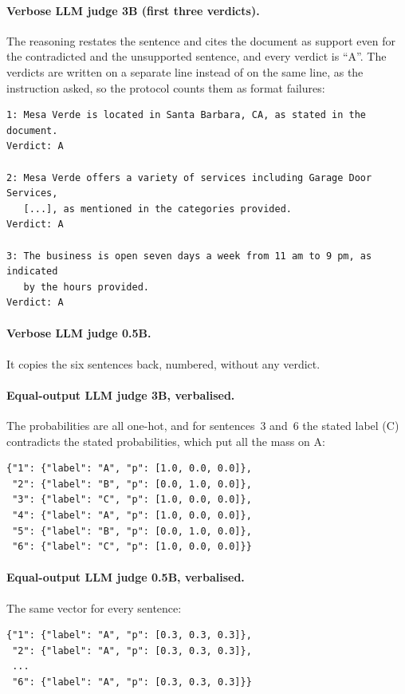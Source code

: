 \paragraph{Verbose LLM judge 3B (first three verdicts).} The reasoning restates the sentence and cites the document as
support even for the contradicted and the unsupported sentence, and every verdict is ``A''. The verdicts are written on
a separate line instead of on the same line, as the instruction asked, so the protocol counts them as format failures:
{\footnotesize
\begin{verbatim}
1: Mesa Verde is located in Santa Barbara, CA, as stated in the document.
Verdict: A

2: Mesa Verde offers a variety of services including Garage Door Services,
   [...], as mentioned in the categories provided.
Verdict: A

3: The business is open seven days a week from 11 am to 9 pm, as indicated
   by the hours provided.
Verdict: A
\end{verbatim}
}

\paragraph{Verbose LLM judge 0.5B.} It copies the six sentences back, numbered, without any verdict.

\paragraph{Equal-output LLM judge 3B, verbalised.} The probabilities are all one-hot, and for sentences~3 and~6 the stated
label (C) contradicts the stated probabilities, which put all the mass on A:
{\footnotesize
\begin{verbatim}
{"1": {"label": "A", "p": [1.0, 0.0, 0.0]},
 "2": {"label": "B", "p": [0.0, 1.0, 0.0]},
 "3": {"label": "C", "p": [1.0, 0.0, 0.0]},
 "4": {"label": "A", "p": [1.0, 0.0, 0.0]},
 "5": {"label": "B", "p": [0.0, 1.0, 0.0]},
 "6": {"label": "C", "p": [1.0, 0.0, 0.0]}}
\end{verbatim}
}

\paragraph{Equal-output LLM judge 0.5B, verbalised.} The same vector for every sentence:
{\footnotesize
\begin{verbatim}
{"1": {"label": "A", "p": [0.3, 0.3, 0.3]},
 "2": {"label": "A", "p": [0.3, 0.3, 0.3]},
 ...
 "6": {"label": "A", "p": [0.3, 0.3, 0.3]}}
\end{verbatim}
}
